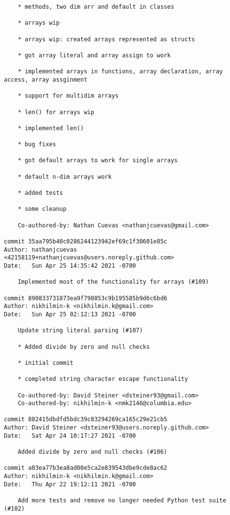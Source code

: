 \documentclass{article}
\begin{document}
\begin{verbatim}
    * methods, two dim arr and default in classes
    
    * arrays wip
    
    * arrays wip: created arrays represented as structs
    
    * got array literal and array assign to work
    
    * implemented arrays in functions, array declaration, array access, array assginment
    
    * support for multidim arrays
    
    * len() for arrays wip
    
    * implemented len()
    
    * bug fixes
    
    * got default arrays to work for single arrays
    
    * default n-dim arrays work
    
    * added tests
    
    * some cleanup
    
    Co-authored-by: Nathan Cuevas <nathanjcuevas@gmail.com>

commit 35aa795b40c0286244123942ef69c1f30601e85c
Author: nathanjcuevas <42158119+nathanjcuevas@users.noreply.github.com>
Date:   Sun Apr 25 14:35:42 2021 -0700

    Implemented most of the functionality for arrays (#109)

commit 890833731873ea9f798853c9b195585b9d6c6bd6
Author: nikhilmin-k <nikhilmin.k@gmail.com>
Date:   Sun Apr 25 02:12:13 2021 -0700

    Update string literal parsing (#107)
    
    * Added divide by zero and null checks
    
    * initial commit
    
    * completed string character escape functionality
    
    Co-authored-by: David Steiner <dsteiner93@gmail.com>
    Co-authored-by: nikhilmin-k <nmk2146@columbia.edu>

commit 882415dbdfd5bdc39c83294269ca165c29e21cb5
Author: David Steiner <dsteiner93@users.noreply.github.com>
Date:   Sat Apr 24 10:17:27 2021 -0700

    Added divide by zero and null checks (#106)

commit a03ea77b3ea8ad00e5ca2e839543dbe9cde8ac62
Author: nikhilmin-k <nikhilmin.k@gmail.com>
Date:   Thu Apr 22 19:12:11 2021 -0700

    Add more tests and remove no longer needed Python test suite (#102)
    

\end{verbatim}
\end{document}
